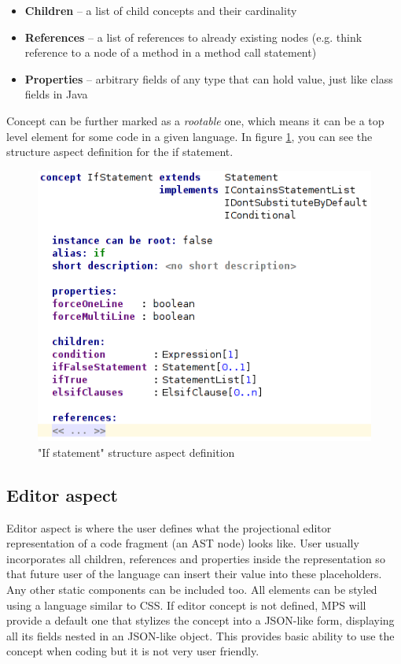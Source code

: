 \begin{itemize}
	\item \textbf{Children} -- a list of child concepts and their cardinality

	\item \textbf{References} -- a list of references to already existing nodes (e.g. think reference to a node of a method in a method call statement)

	\item \textbf{Properties} -- arbitrary fields of any type that can hold value, just like class fields in Java
\end{itemize}

Concept can be further marked as a \textit{rootable} one, which means it can be a top level element for some code in a given language. In figure \ref{fig:if_statement_structure}, you can see the structure aspect definition for the if statement.

\begin{figure}[h]
	\centering
	\includegraphics[scale=0.75]{./img/if_statement_structure.png}
	\caption{"If statement" structure aspect definition}
	\label{fig:if_statement_structure}
\end{figure}

\subsection{Editor aspect}
Editor aspect is where the user defines what the projectional editor representation of a code fragment (an AST node) looks like.
User usually incorporates all children, references and properties inside the representation so that future user of the language can insert their value into these placeholders.
Any other static components can be included too.
All elements can be styled using a language similar to CSS.
If editor concept is not defined, MPS will provide a default one that stylizes the concept into a JSON-like form, displaying all its fields nested in an JSON-like object.
This provides basic ability to use the concept when coding but it is not very user friendly.

